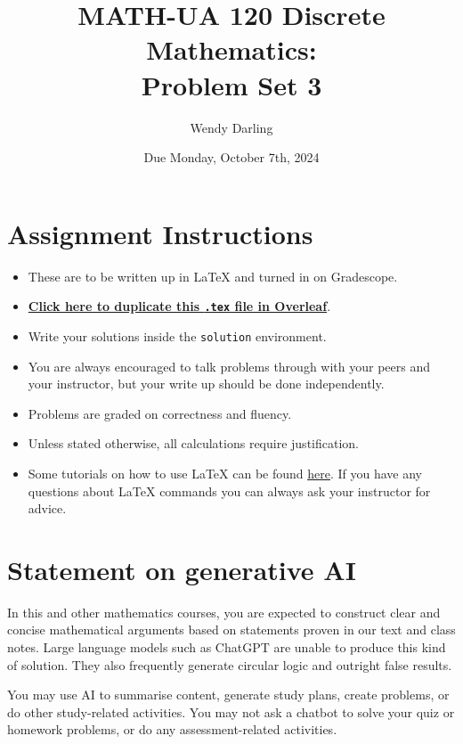 \documentclass{article}
\title{\textbf{MATH-UA 120 Discrete Mathematics: \\ Problem Set 3}}
\author{%
    Wendy Darling %
}
\date{Due Monday, October 7th, 2024} %
\theoremstyle{definition}
\begin{document}
\maketitle %

\vfill

\section*{Assignment Instructions}

\begin{itemize}
    \item These are to be written up in \LaTeX{} and turned in on Gradescope.
    \item \href{https://bit.ly/3Tb7ZMc}{\textbf{Click here to duplicate this \texttt{.tex} file in Overleaf}}.
    \item Write your solutions inside the \texttt{solution} environment.
    \item You are always encouraged to talk problems through with your peers and your instructor, but your write up should be done independently.
    \item Problems are graded on correctness and fluency.
    \item Unless stated otherwise, all calculations require justification.
    \item Some tutorials on how to use \LaTeX{} can be found \href{https://www.overleaf.com/learn/latex/Tutorials}{\underline{here}}. If you have any questions about \LaTeX{} commands you can always ask your instructor for advice.
\end{itemize}

\vfill

\section*{Statement on generative AI}

In this and other mathematics courses, you are expected to construct clear and concise mathematical arguments based on statements proven in our text and class notes. Large language models such as ChatGPT are unable to produce this kind of solution. They also frequently generate circular logic and outright false results.
 
You may use AI to summarise content, generate study plans, create problems, or do other study-related activities. You may not ask a chatbot to solve your quiz or homework problems, or do any assessment-related activities.
 
\end{document}
